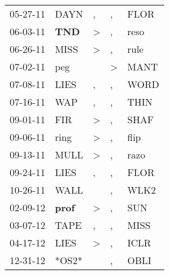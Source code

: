 \begin{supertabular}{p{0.07\textwidth}p{0.06\textwidth}p{0.02\textwidth}p{0.02\textwidth}p{0.06\textwidth}}
 05-27-11\textsuperscript{} &           DAYN\textsuperscript{} &             , &             , &  FLOR\textsuperscript{} \\
 06-03-11\textsuperscript{} &   \textbf{TND\textsuperscript{}} &  \textgreater &             , &  reso\textsuperscript{} \\
 06-26-11\textsuperscript{} &           MISS\textsuperscript{} &  \textgreater &             , &  rule\textsuperscript{} \\
 07-02-11\textsuperscript{} &            peg\textsuperscript{} &               &  \textgreater &  MANT\textsuperscript{} \\
 07-08-11\textsuperscript{} &           LIES\textsuperscript{} &             , &             , &  WORD\textsuperscript{} \\
 07-16-11\textsuperscript{} &            WAP\textsuperscript{} &             , &             , &  THIN\textsuperscript{} \\
 09-01-11\textsuperscript{} &            FIR\textsuperscript{} &  \textgreater &             , &  SHAF\textsuperscript{} \\
 09-06-11\textsuperscript{} &           ring\textsuperscript{} &  \textgreater &             , &  flip\textsuperscript{} \\
 09-13-11\textsuperscript{} &           MULL\textsuperscript{} &  \textgreater &             , &  razo\textsuperscript{} \\
 09-24-11\textsuperscript{} &           LIES\textsuperscript{} &             , &             , &  FLOR\textsuperscript{} \\
 10-26-11\textsuperscript{} &           WALL\textsuperscript{} &               &             , &  WLK2\textsuperscript{} \\
 02-09-12\textsuperscript{} &  \textbf{prof\textsuperscript{}} &  \textgreater &             , &   SUN\textsuperscript{} \\
 03-07-12\textsuperscript{} &           TAPE\textsuperscript{} &             , &             , &  MISS\textsuperscript{} \\
 04-17-12\textsuperscript{} &           LIES\textsuperscript{} &  \textgreater &             , &  ICLR\textsuperscript{} \\
 12-31-12\textsuperscript{} &                            *OS2* &               &             , &  OBLI\textsuperscript{} \\

\end{supertabular}
